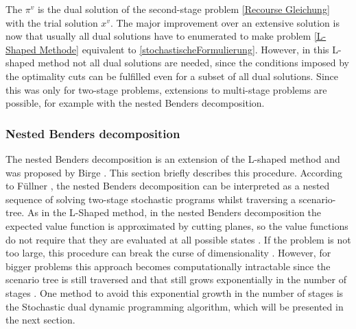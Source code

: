 The $\pi^v$ is the dual solution of the second-stage problem \ref{Recourse Gleichung} with the trial solution $x^v$.
The major improvement over an extensive solution is now that usually all dual solutions have to enumerated to make problem \ref{L-Shaped Methode} equivalent to \ref{stochastischeFormulierung}.
However, in this L-shaped method not all dual solutions are needed, since the conditions imposed by the optimality cuts can be fulfilled even for a subset of all dual solutions.
Since this was only for two-stage problems, extensions to multi-stage problems are possible, for example with the nested Benders decomposition.

\subsubsection{Nested Benders decomposition}
The nested Benders decomposition is an extension of the L-shaped method and was proposed by Birge \cite{Birge1980SolutionMF}. This section briefly describes this procedure.
According to F\"ullner \cite{Fuellner_SDDP_TUT}, the nested Benders decomposition can be interpreted as a nested sequence of solving 
two-stage stochastic programs whilst traversing a scenario-tree.
As in the L-Shaped method, in the nested Benders decomposition the expected value function is approximated by cutting planes, so the value functions do not require that they are evaluated at all possible states \cite{Fuellner_SDDP_TUT}.
If the problem is not too large, this procedure can break the curse of dimensionality \cite{Fuellner_SDDP_TUT}.
However, for bigger problems this approach becomes computationally intractable since the scenario tree is still traversed and that still grows exponentially in the number of stages \cite{Fuellner_SDDP_TUT}.
One method to avoid this exponential growth in the number of stages is the Stochastic dual dynamic programming algorithm, which will be presented in the next section.
